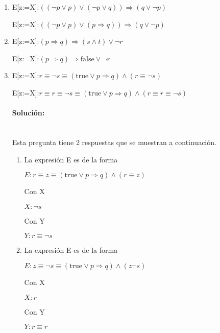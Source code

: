 \documentclass{article}
\newcommand{\myparagraph}[1]{\paragraph{#1}\mbox{}\\}
\begin{document}
\begin{enumerate}
\begin{enumerate}
		\item  E[z:=X]:$((\neg p \lor p) \lor (\neg p \lor q)) \Rightarrow (q \lor \neg p)$ \par
		 E[z:=X]:$((\neg p \lor p) \lor (p \Rightarrow q)) \Rightarrow (q \lor \neg p)$ \par

		\item  E[z:=X]:$(p \Rightarrow q) \Rightarrow (s \land t) \lor \neg r$\par
		 E[z:=X]:$(p \Rightarrow q) \Rightarrow \text{false} \lor \neg r$ \par

		\item  E[z:=X]:$r \equiv \neg s \equiv ( \text{true} \lor p \Rightarrow q) \land (r \equiv \neg s)$ \par
		 E[z:=X]:$r \equiv r \equiv \neg s \equiv ( \text{true} \lor p \Rightarrow q) \land (r \equiv r \equiv \neg s)$ \par
			
		 
		 \myparagraph{Solución:}
		 Esta pregunta tiene 2 respuestas que se muestran a continuación.
		 \begin{enumerate}
			 \item \textlangle{} La expresión E es de la forma \textrangle\par
			 $E: r \equiv z \equiv ( \text{true} \lor p \Rightarrow q) \land (r \equiv z)$\par
			 \textlangle{} Con X \textrangle\par
			 $X: \neg s$\par
			 \textlangle{} Con Y \textrangle\par
			 $Y: r \equiv \neg s$\par
			 \hspace{0.8cm}

			 \item \textlangle{} La expresión E es de la forma \textrangle\par
			 $E: z \equiv \neg s \equiv ( \text{true} \lor p \Rightarrow q) \land (z \neg s)$\par
			 \textlangle{} Con X \textrangle\par
			 $X: r$\par
			 \textlangle{} Con Y \textrangle\par
			 $Y: r \equiv r$\par
		 \end{enumerate}

	\end{enumerate}


\end{enumerate}
\end{document}
